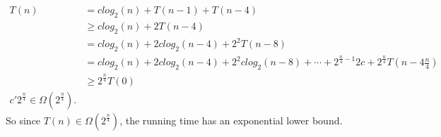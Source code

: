 \documentclass[10pt,oneside,reqno]{amsart}
\theoremstyle{plain}
\theoremstyle{definition}
\begin{document}
\begin{enumerate}[label=\arabic*.]
\begin{enumerate}
\begin{equation}
\begin{aligned}
T(n) &= clog_2(n) + T(n - 1) + T(n - 4)\\
&\geq clog_2(n) + 2T(n - 4)\\
&= clog_2(n) + 2clog_2(n - 4) + 2^2T(n - 8)\\
&= clog_2(n) + 2clog_2(n - 4) + 2^2clog_2(n - 8) + \cdots+ 2^{\frac{n}{4} - 1}2c +  2^{\frac{n}{4}}T(n - 4\frac{n}{4})\\
&\geq 2^{\frac{n}{4}}T(0) \\ c'2^{\frac{n}{4}} \in \Omega(2^{\frac{n}{4}}). 
\end{aligned}
\end{equation}
So since $T(n) \in \Omega(2^{\frac{n}{4}})$, the running time has an exponential lower bound. \\

\end{enumerate}


\end{enumerate}
\end{document}
